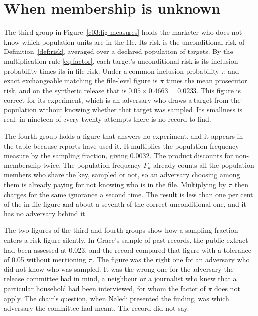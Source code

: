 \section{When membership is unknown}

The third group in Figure~\ref{c03:fig-measures} holds the marketer who does not know
which population units are in the file. Its risk is the unconditional risk of
Definition~\ref{def:risk}, averaged over a declared population of targets. By the
multiplication rule \eqref{eq:factor}, each target's unconditional risk is its inclusion
probability times its in-file risk. Under a common inclusion probability $\pi$ and exact
exchangeable matching the file-level figure is $\pi$ times the mean prosecutor risk, and
on the synthetic release that is $0.05 \times 0.4663 = 0.0233$.
This figure is correct for its experiment, which is an adversary who draws a target from
the population without knowing whether that target was sampled. Its smallness is real:
in nineteen of every twenty attempts there is no record to find.

The fourth group holds a figure that answers no experiment, and it appears in the table
because reports have used it. It multiplies the population-frequency measure by the
sampling fraction, giving 0.0032.
The product discounts for non-membership twice. The population frequency $F_k$ already
counts all the population members who share the key, sampled or not, so an adversary
choosing among them is already paying for not knowing who is in the file. Multiplying
by $\pi$ then charges for the same ignorance a second time. The result is less than one
per cent of the in-file figure and about a seventh of the correct unconditional one,
and it has no adversary behind it.

The two figures of the third and fourth groups show how a sampling fraction enters a
risk figure silently. In Grace's sample of past records, the public extract had been
assessed at 0.023, and the record compared that figure with a tolerance of 0.05 without
mentioning $\pi$. The figure was the right one for an adversary who did not know who was
sampled. It was the wrong one for the adversary the release committee had in mind, a
neighbour or a journalist who knew that a particular household had been interviewed,
for whom the factor of $\pi$ does not apply. The chair's question, when Naledi presented
the finding, was which adversary the committee had meant. The record did not say.

